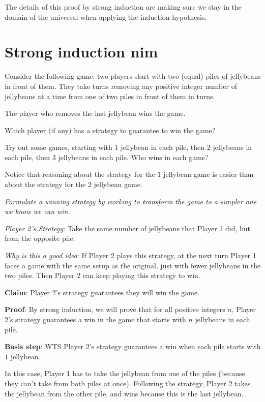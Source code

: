\documentclass[12pt, oneside]{article}
\begin{document}
\vspace{-10pt}
The details of this proof by strong induction are making sure we 
stay in the domain of the universal when applying the induction hypothesis.
 \vfill
\section*{Strong induction nim}


Consider the following game: two players start with 
two (equal) piles of jellybeans in front of them.
They take turns removing any positive integer number
of jellybeans at a time from one of two piles in 
front of them in turns.

The player who removes the last jellybean wins the game.

Which player (if any) has a strategy to guarantee
to win the game?


Try out some games, starting with $1$ jellybean in each pile,
then $2$ jellybeans in each pile, then $3$ jellybeans in each pile.
Who wins in each game?

\vspace{200pt}


Notice that reasoning about the strategy for the $1$ jellybean 
game is easier than about the strategy for the $2$ jellybean game.

{\it Formulate a winning strategy by working to 
transform the game to a simpler one we know we can win.}

\newpage

{\it Player 2's Strategy}: Take the same number of jellybeans that Player 1 did, 
but from the opposite pile. 


{\it Why is this a good idea}: If Player 2 plays this strategy, at the next turn
Player 1 faces a game with the same setup as the original, just with fewer
jellybeans in the two piles. Then Player 2 can keep playing this strategy to win.

{\bf Claim}: Player 2's strategy guarantees they will win the game.

{\bf Proof}: By strong induction, we will prove that for all positive 
integers $n$, Player 2's strategy guarantees a win in the game that starts with 
$n$ jellybeans in each pile.

{\bf Basis step}: WTS Player 2's strategy guarantees a win 
when each pile starts with $1$ jellybean.

In this case, Player 1 has to take the jellybean from one of the piles
(because they can't take from both piles at once).
Following the strategy, Player 2 takes the jellybean from the 
other pile, and wins because this is the last jellybean.
\end{document}
